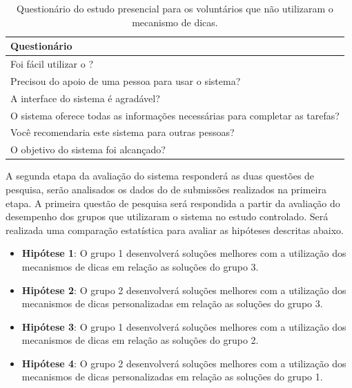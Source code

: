 \begin{table}[]
	\centering
	\captionsetup{justification=centering}
	\caption{Questionário do estudo presencial para os voluntários que não utilizaram o mecanismo de dicas.}
	\label{tabela:questionárioestudosemdica}
	\begin{tabular}{l}
		\hline
		Questionário                        											\\ \hline
		Foi fácil utilizar o \foreign{iHint}?                            				\\
		Precisou do apoio de uma pessoa para usar o sistema?                           	\\
		A interface do sistema é agradável?                        						\\
		O sistema oferece todas as informações necessárias para completar as tarefas?   \\
		Você recomendaria este sistema para outras pessoas?                           	\\
		O objetivo do sistema foi alcançado? 											\\ \hline
	\end{tabular}
\end{table}

A segunda etapa da avaliação do sistema responderá as duas questões de pesquisa, serão analisados os dados do  de submissões realizados na primeira etapa. A primeira questão de pesquisa será respondida a partir da avaliação do desempenho dos grupos que utilizaram o sistema no estudo controlado. Será realizada uma comparação estatística para avaliar as hipóteses descritas abaixo. 

\begin{itemize}
	\item \textbf{Hipótese 1}: O grupo 1 desenvolverá soluções melhores com a utilização dos mecanismos de dicas em relação as soluções do grupo 3.
	\item \textbf{Hipótese 2}: O grupo 2 desenvolverá soluções melhores com a utilização dos mecanismos de dicas personalizadas em relação as soluções do grupo 3.	
	\item \textbf{Hipótese 3}: O grupo 1 desenvolverá soluções melhores com a utilização dos mecanismos de dicas em relação as soluções do grupo 2.	
	\item \textbf{Hipótese 4}: O grupo 2 desenvolverá soluções melhores com a utilização dos mecanismos de dicas personalizadas em relação as soluções do grupo 1.
\end{itemize}

